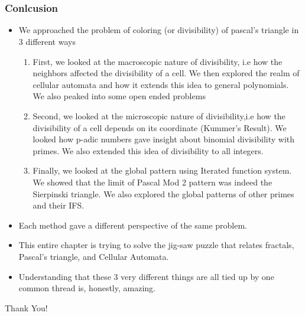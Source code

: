 \documentclass{beamer}
\begin{document}
\section*{}
\begin{frame}
    \frametitle{Conlcusion}
    \begin{itemize}
        \item We approached the problem of coloring (or divisibility) of pascal's triangle in 3 different ways 
        \begin{enumerate}
            \item First, we looked at the macroscopic nature of divisibility, i.e how the neighbors affected the divisibility of a cell. We then explored the realm of cellular automata and how it extends this idea to general polynomials. We also peaked into some open ended problems
            \item Second, we looked at the microscopic nature of divisibility,i.e how the divisibility of a cell depends on its coordinate (Kummer's Result). We looked how p-adic numbers gave insight about binomial divisibility with primes. We also extended this idea of divisibility to all integers.
            \item Finally, we looked at the global pattern using Iterated function system. We showed that the limit of Pascal Mod 2 pattern was indeed the Sierpinski triangle. We also explored the global patterns of other primes and their IFS. 
        \end{enumerate}
    \end{itemize}
\end{frame}

\begin{frame}
    \begin{itemize}
        \item Each method gave a different perspective of the same problem.
        \item This entire chapter is trying to solve the jig-saw puzzle that relates fractals, Pascal's triangle, and Cellular Automata. 
        \item Understanding that these 3 very different things are all tied up by one common thread is, honestly, amazing.
    \end{itemize}
\end{frame}

\begin{frame}
    \centering 
    \Huge{Thank You!}
\end{frame}


\end{document}
